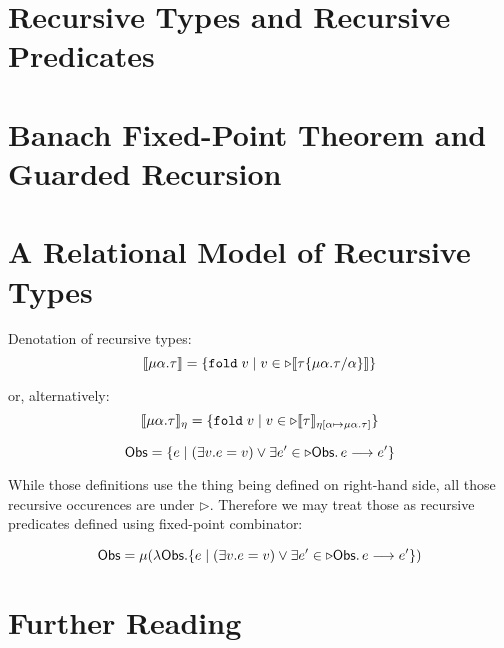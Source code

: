 \section{Recursive Types and Recursive Predicates}

\section{Banach Fixed-Point Theorem and Guarded Recursion}

\section{A Relational Model of Recursive Types}

Denotation of recursive types:
\[
  \llbracket\mu\alpha.\tau\rrbracket = \{\texttt{fold}\;v \mid v \in\triangleright\llbracket\tau\{\mu\alpha.\tau/\alpha\}\rrbracket \}
\]

or, alternatively:
\[
  \llbracket\mu\alpha.\tau\rrbracket_{\eta} = \{\texttt{fold}\;v \mid v \in\triangleright\llbracket\tau\rrbracket_{\eta[\alpha\mapsto \mu\alpha.\tau]} \}
\]

\[
  \mathsf{Obs} = \{ e \mid (\exists v.e=v) \lor \exists e' \in\triangleright\mathsf{Obs} \ldotp e \longrightarrow e' \}
\]

While those definitions use the thing being defined on right-hand side, all those recursive occurences are under $\triangleright$.
Therefore we may treat those as recursive predicates defined using fixed-point combinator: 

\[
  \mathsf{Obs} = \mu(\lambda \mathsf{Obs}. \{ e \mid (\exists v.e=v) \lor \exists e' \in\triangleright\mathsf{Obs} \ldotp e \longrightarrow e' \})
\]
\section{Further Reading}

